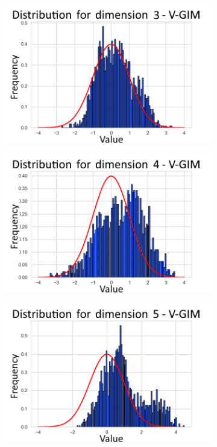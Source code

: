 \begin{figure}[h]
\begin{subfigure}[b]{0.25\textwidth}
		\centering
		\includegraphics[width=1\linewidth]{"graphs/distr/module2 kld0035/_ distribution_latent_space_GIM_dim=2"}
	\end{subfigure}
	\hfill
	\begin{subfigure}[b]{0.25\textwidth}
		\centering
		\includegraphics[width=1\linewidth]{"graphs/distr/module2 kld0035/_ distribution_latent_space_GIM_dim=3"}
	\end{subfigure}
	\hfill
	\begin{subfigure}[b]{0.25\textwidth}
		\centering
		\includegraphics[width=1\linewidth]{"graphs/distr/module2 kld0035/_ distribution_latent_space_GIM_dim=4"}

\end{subfigure}
\end{figure}
